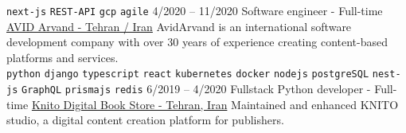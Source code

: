\begin{entrylist}
{        \texttt{next-js}\slashsep
        \texttt{REST-API}\slashsep
        \texttt{gcp}\slashsep
        \texttt{agile}\slashsep
    }
    \entry
    {4/2020 -- 11/2020}
    {Software engineer - Full-time}
    {
        \href{https://www.linkedin.com/company/avid-technology-development/}{AVID Arvand - Tehran / Iran}}
    {
        AvidArvand is an international software development company with over 30 years of experience creating content-based platforms and services. \\
        \texttt{python}\slashsep
        \texttt{django}\slashsep
        \texttt{typescript}\slashsep
        \texttt{react}\slashsep
        \texttt{kubernetes}\slashsep
        \texttt{docker}\slashsep
        \texttt{nodejs}\slashsep
        \texttt{postgreSQL}\slashsep
        \texttt{nest-js}\slashsep
        \texttt{GraphQL}\slashsep
        \texttt{prismajs}\slashsep
        \texttt{redis}\slashsep
    }
    \entry
    {6/2019 -- 4/2020}
    {Fullstack Python developer - Full-time}
    {
        \href{https://knito.com/}{Knito Digital Book Store - Tehran, Iran}}
    {
        Maintained and enhanced KNITO studio, a digital content creation platform for publishers. \\
}
\end{entrylist}

